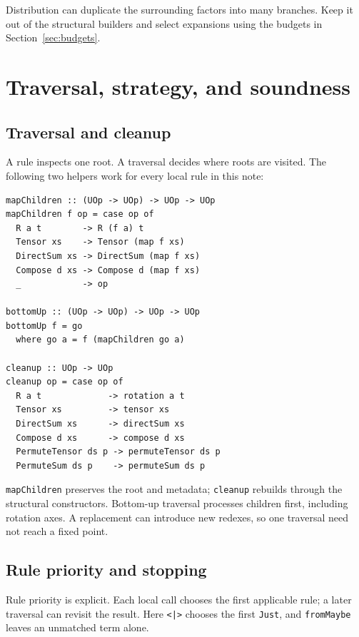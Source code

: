 \documentclass[11pt,a4paper]{article}
\newcommand{\code}[1]{\texttt{#1}}
\begin{document}
Distribution can duplicate the surrounding factors into many branches.
Keep it out of the structural builders and select expansions using the
budgets in Section~\ref{sec:budgets}.

\section{Traversal, strategy, and soundness}

\subsection{Traversal and cleanup}

\label{sec:traversal}

A rule inspects one root. A traversal decides where roots are visited.
The following two helpers work for every local rule in this note:

\begin{lstlisting}
mapChildren :: (UOp -> UOp) -> UOp -> UOp
mapChildren f op = case op of
  R a t        -> R (f a) t
  Tensor xs    -> Tensor (map f xs)
  DirectSum xs -> DirectSum (map f xs)
  Compose d xs -> Compose d (map f xs)
  _            -> op

bottomUp :: (UOp -> UOp) -> UOp -> UOp
bottomUp f = go
  where go a = f (mapChildren go a)

cleanup :: UOp -> UOp
cleanup op = case op of
  R a t             -> rotation a t
  Tensor xs         -> tensor xs
  DirectSum xs      -> directSum xs
  Compose d xs      -> compose d xs
  PermuteTensor ds p -> permuteTensor ds p
  PermuteSum ds p    -> permuteSum ds p
\end{lstlisting}

\code{mapChildren} preserves the root and metadata; \code{cleanup}
rebuilds through the structural constructors. Bottom-up traversal
processes children first, including rotation axes. A replacement can
introduce new redexes, so one traversal need not reach a fixed point.

\subsection{Rule priority and stopping}

\label{sec:strategy}

Rule priority is explicit. Each local call chooses the first applicable
rule; a later traversal can revisit the result. Here \code{<|>} chooses
the first \code{Just}, and \code{fromMaybe} leaves an unmatched term alone.
\end{document}
